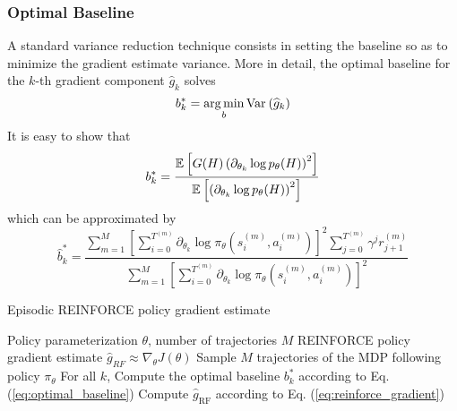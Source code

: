 \subsubsection{Optimal Baseline}
A standard variance reduction technique consists in setting the baseline so as to minimize the gradient estimate variance. More in detail, the optimal baseline for the $k$-th gradient component $\widehat{g}_{k}$ solves
\begin{equation*}
	b_k^* = \operatorname*{arg\,min}_b \operatorname{Var}_{}\left( \widehat{g}_{k} \right)
\end{equation*} 
It is easy to show that 
\begin{equation*}
	b_k^* = \frac{\mathbb{E}_{}\left[ G(H) \left(\partial_{\theta_k} \log p_\theta(H)\right)^2   \right]}{\mathbb{E}_{}\left[ \left(\partial_{\theta_k} \log p_\theta(H)\right)^2 \right]}
\end{equation*}
which can be approximated by 
\begin{equation}
	\label{eq:optimal_baseline}
	\widehat{b}_k^* = \frac{\sum^{M}_{m=1} \left[ \sum_{i=0}^{T^{(m)}} 
		\partial_{\theta_k} \log \pi_\theta\left(s_i^{(m)}, a_i^{(m)}\right) \right]^2 
		\sum^{T^{(m)}}_{j=0} \gamma^j r_{j+1}^{(m)}}{\sum^{M}_{m=1} \left[ \sum_{i=0}^{T^{(m)}} \partial_{\theta_k} \log \pi_\theta\left(s_i^{(m)}, a_i^{(m)}\right) \right]^2}
\end{equation}

\begin{algorithm}[t]
	\caption{Episodic REINFORCE policy gradient estimate}
	\label{algo:reinforce}
	\begin{algorithmic}[1]
		\Require Policy parameterization $\theta$, number of trajectories $M$
		\Ensure REINFORCE policy gradient estimate $\widehat{g}_{RF} \approx \nabla_\theta J(\theta)$
		\State Sample $M$ trajectories of the MDP following policy $\pi_\theta$
		\State For all $k$, Compute the optimal baseline $b_k^*$ according to Eq. (\ref{eq:optimal_baseline})
		\State Compute $\widehat{g}_{\text{RF}}$ according to Eq. (\ref{eq:reinforce_gradient})
	\end{algorithmic}
\end{algorithm}

